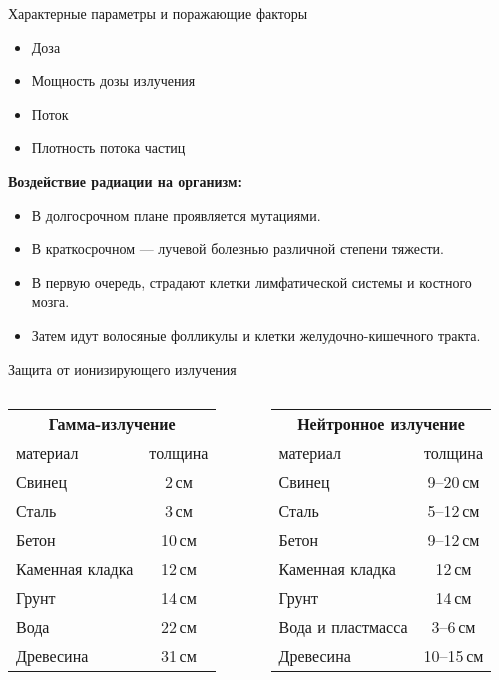 \documentclass[unicode,lefteqn,c,hyperref={pdfpagelabels=false},12pt]{beamer}
\begin{document}
\begin{frame}{Характерные параметры и поражающие факторы}
    \begin{itemize}
        \item Доза
        \item Мощность дозы излучения
        \item Поток
        \item Плотность потока частиц
    \end{itemize}
    \smallskip

    \textbf{Воздействие радиации на организм:}
    \begin{itemize}
        \item В долгосрочном плане проявляется мутациями.
        \item В краткосрочном --- лучевой болезнью различной степени тяжести.
        \item В первую очередь, страдают клетки лимфатической системы и костного мозга.
        \item Затем идут волосяные фолликулы и клетки желудочно-кишечного тракта.
    \end{itemize}
\end{frame}


\begin{frame}{Защита от ионизирующего излучения}


\begin{columns}
        \begin{tabular}{l|c}
        \multicolumn{2}{c}{\textbf{Гамма-излучение}}\\
        материал & толщина\\ 
        \hline
        Свинец & 2\,см \\
        Сталь & 3\,см \\
        Бетон & 10\,см  \\ 
        Каменная кладка & 12\,см \\
        Грунт & 14\,см \\
        Вода & 22\,см \\
        Древесина & 31\,см \\
        \end{tabular}
        \begin{tabular}{l|c}
        \multicolumn{2}{c}{\textbf{Нейтронное излучение}} \\
        материал & толщина\\ 
        \hline
        Свинец & 9--20\,см \\
        Сталь & 5--12\,см \\
        Бетон & 9--12\,см  \\
        Каменная кладка & 12\,см \\
        Грунт & 14\,см \\
        Вода и пластмасса  & 3--6\,см \\
        Древесина & 10--15\,см \\
        \end{tabular}

\end{columns}
\end{frame}
\end{document}

